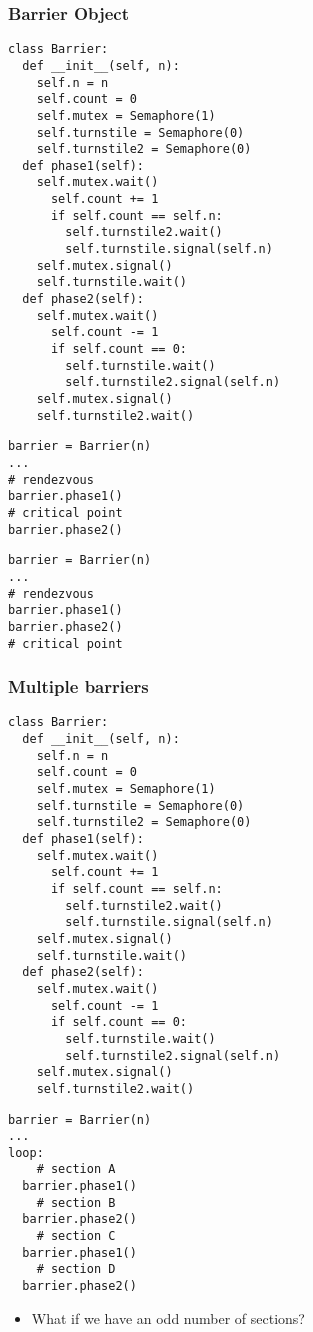 \documentclass{beamer}
\newcommand{\bi}{\begin{itemize}}
\newcommand{\ii}{\item}
\newcommand{\ei}{\end{itemize}}
\newcommand{\bfr}[1]{\begin{frame}[fragile]\frametitle{{ #1 }}}
\begin{document}
\bfr{Barrier Object}
\begin{minipage}{0.6\textwidth}
\begin{Verbatim}[fontsize=\relsize{-2}]
class Barrier:
  def __init__(self, n):
    self.n = n
    self.count = 0
    self.mutex = Semaphore(1)
    self.turnstile = Semaphore(0)
    self.turnstile2 = Semaphore(0)
  def phase1(self):
    self.mutex.wait()
      self.count += 1
      if self.count == self.n:
        self.turnstile2.wait()
        self.turnstile.signal(self.n)
    self.mutex.signal()
    self.turnstile.wait()
  def phase2(self):
    self.mutex.wait()
      self.count -= 1
      if self.count == 0:
        self.turnstile.wait()
        self.turnstile2.signal(self.n)
    self.mutex.signal()
    self.turnstile2.wait()
\end{Verbatim}
\end{minipage}\hfill\begin{minipage}{0.35\textwidth}
\begin{Verbatim}
barrier = Barrier(n)
...
# rendezvous
barrier.phase1()
# critical point
barrier.phase2()
\end{Verbatim}
\begin{Verbatim}
barrier = Barrier(n)
...
# rendezvous
barrier.phase1()
barrier.phase2()
# critical point
\end{Verbatim}
\end{minipage}
\end{frame}


\bfr{Multiple barriers}
\begin{minipage}{0.6\textwidth}
\begin{Verbatim}[fontsize=\relsize{-2}]
class Barrier:
  def __init__(self, n):
    self.n = n
    self.count = 0
    self.mutex = Semaphore(1)
    self.turnstile = Semaphore(0)
    self.turnstile2 = Semaphore(0)
  def phase1(self):
    self.mutex.wait()
      self.count += 1
      if self.count == self.n:
        self.turnstile2.wait()
        self.turnstile.signal(self.n)
    self.mutex.signal()
    self.turnstile.wait()
  def phase2(self):
    self.mutex.wait()
      self.count -= 1
      if self.count == 0:
        self.turnstile.wait()
        self.turnstile2.signal(self.n)
    self.mutex.signal()
    self.turnstile2.wait()
\end{Verbatim}
\end{minipage}\hfill\begin{minipage}{0.35\textwidth}
\begin{Verbatim}
barrier = Barrier(n)
...
loop:
    # section A
  barrier.phase1()
    # section B
  barrier.phase2()
    # section C
  barrier.phase1()
    # section D
  barrier.phase2()
\end{Verbatim}
\pause\bi
\ii What if we have an odd number of sections?
\ei
\end{minipage}
\end{frame}
\end{document}
